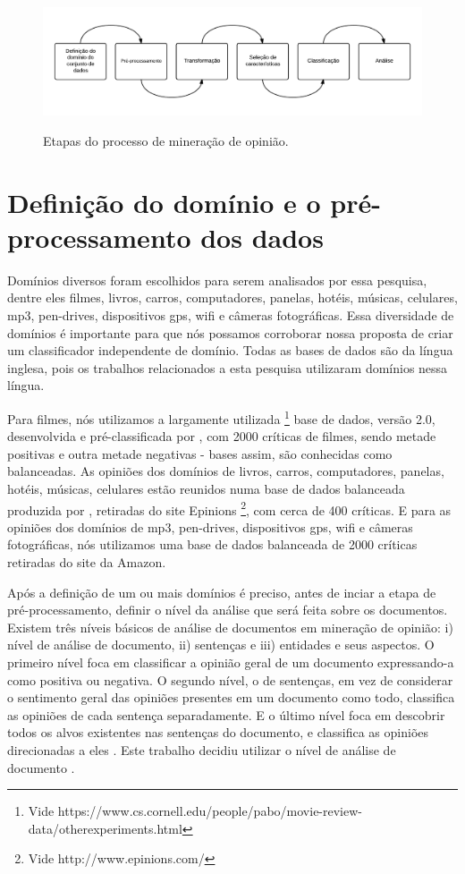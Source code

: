 \begin{figure}[h]
\caption{Etapas do processo de mineração de opinião.}
\centering
\includegraphics[scale=0.35]{opinion_mining_process.png}
\label{figura:processo_mineracao}
\end{figure}

\section{Definição do domínio e o pré-processamento dos dados}

Domínios diversos foram escolhidos para serem analisados por essa pesquisa, dentre eles filmes, livros, carros, computadores, panelas, hotéis, músicas, celulares, mp3, pen-drives, dispositivos gps, wifi e câmeras fotográficas. Essa diversidade de domínios é importante para que nós possamos corroborar nossa proposta de criar um classificador independente de domínio. Todas as bases de dados são da língua inglesa, pois os trabalhos relacionados a esta pesquisa utilizaram domínios nessa língua.

Para filmes, nós utilizamos a largamente utilizada \footnote{Vide https://www.cs.cornell.edu/people/pabo/movie-review-data/otherexperiments.html} base de dados, versão 2.0, desenvolvida e pré-classificada por \cite{pang2004sentimental}, com 2000 críticas de filmes, sendo metade positivas e outra metade negativas - bases assim, são conhecidas como balanceadas. As opiniões dos domínios de livros, carros, computadores, panelas, hotéis, músicas, celulares estão reunidos numa base de dados balanceada produzida por \cite{taboada2011lexicon}, retiradas do site Epinions \footnote{Vide http://www.epinions.com/}, com cerca de 400 críticas. E para as opiniões dos domínios de mp3, pen-drives, dispositivos gps, wifi e câmeras fotográficas, nós utilizamos uma base de dados balanceada de 2000 críticas retiradas do site da Amazon. 

Após a definição de um ou mais domínios é preciso, antes de inciar a etapa de pré-processamento, definir o nível da análise que será feita sobre os documentos. Existem três níveis básicos de análise de documentos em mineração de opinião: i) nível de análise de documento, ii) sentenças e iii) entidades e seus aspectos. O primeiro nível foca em classificar a opinião geral de um documento expressando-a como positiva ou negativa. O segundo nível, o de sentenças, em vez de considerar o sentimento geral das opiniões presentes em um documento como todo, classifica as opiniões de cada sentença separadamente. E o último nível foca em descobrir todos os alvos existentes nas sentenças do documento, e classifica as opiniões direcionadas a eles \cite{bing:2012}. Este trabalho decidiu utilizar o nível de análise de documento \cite{joachims1998text, pang2002thumbs, gamon2004sentiment, mullen2004sentiment, pang2004sentimental, cui2006comparative}.

